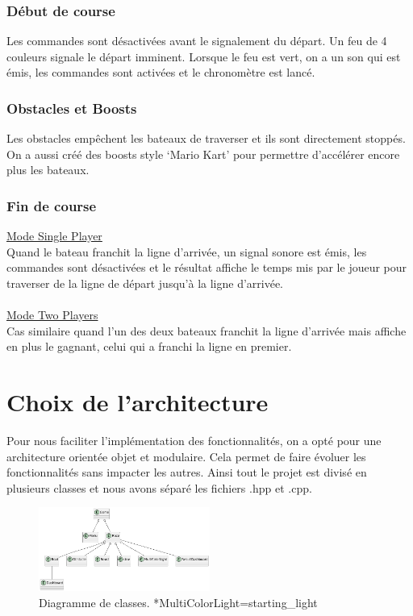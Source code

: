 \documentclass[a4paper,margin=1cm,11pt]{report}
\begin{document}
\subsection{Début de course}
Les commandes sont désactivées avant le signalement du départ. Un feu de 4 couleurs signale le départ imminent. Lorsque le feu est vert, on a un son qui est émis, les commandes sont activées et le chronomètre est lancé.

\subsection{Obstacles et Boosts}
Les obstacles empêchent les bateaux de traverser et ils sont directement stoppés. 
On a aussi créé des boosts style ‘Mario Kart’ pour permettre d’accélérer encore plus les bateaux.

\subsection{Fin de course}
\underline{Mode Single Player}\\
Quand le bateau franchit la ligne d’arrivée, un signal sonore est émis, les commandes sont désactivées et le résultat affiche le temps mis par le joueur pour traverser de la ligne de départ jusqu’à la ligne d’arrivée.\\\\
\underline{Mode Two Players}\\
Cas similaire quand l’un des deux bateaux franchit la ligne d’arrivée mais affiche en plus le gagnant, celui qui a franchi la ligne en premier.


\chapter{Choix de l'architecture}
Pour nous faciliter l’implémentation des fonctionnalités, on a opté pour une architecture orientée objet et modulaire. Cela permet de faire évoluer les fonctionnalités sans impacter les autres. Ainsi tout le projet est divisé en plusieurs classes et nous avons séparé les fichiers .hpp et .cpp. 

\begin{figure}[h]
	\centering
	\includegraphics[width=0.5\textwidth]{diagrammeClasses}
	\caption{Diagramme de classes. *MultiColorLight=starting\_light}
	\label{fig:monimage}
\end{figure}
\end{document}
